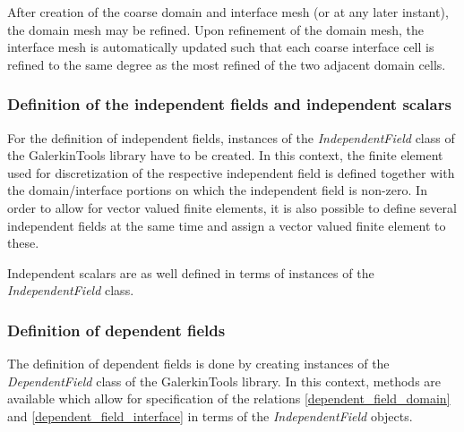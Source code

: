 \documentclass[pdftex,a4paper,12pt,abstracton]{scrartcl}
\begin{document}
After creation of the coarse domain and interface mesh (or at any later instant), the domain mesh may be refined. Upon refinement of the domain mesh, the interface mesh is automatically updated such that each coarse interface cell is refined to the same degree as the most refined of the two adjacent domain cells.

\subsubsection{Definition of the independent fields and independent scalars}
For the definition of independent fields, instances of the \textit{IndependentField} class of the GalerkinTools library have to be created. In this context, the finite element used for discretization of the respective independent field is defined together with the domain/interface portions on which the independent field is non-zero. In order to allow for vector valued finite elements, it is also possible to define several independent fields at the same time and assign a vector valued finite element to these.

Independent scalars are as well defined in terms of instances of the \textit{IndependentField} class.

\subsubsection{Definition of dependent fields}
The definition of dependent fields is done by creating instances of the \textit{DependentField} class of the GalerkinTools library. In this context, methods are available which allow for specification of the relations \eqref{dependent_field_domain} and \eqref{dependent_field_interface} in terms of the \textit{IndependentField} objects.
\end{document}
